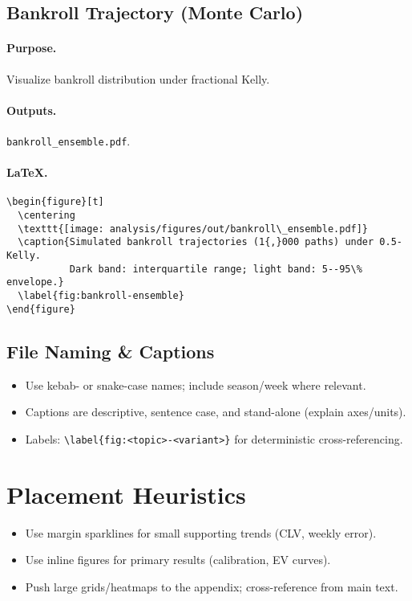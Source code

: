 \subsection{Bankroll Trajectory (Monte Carlo)}
\paragraph{Purpose.} Visualize bankroll distribution under fractional Kelly.
\paragraph{Outputs.} \texttt{bankroll\_ensemble.pdf}.
\paragraph{LaTeX.}
\begin{verbatim}
\begin{figure}[t]
  \centering
  \texttt{[image: analysis/figures/out/bankroll\_ensemble.pdf]}
  \caption{Simulated bankroll trajectories (1{,}000 paths) under 0.5-Kelly.
           Dark band: interquartile range; light band: 5--95\% envelope.}
  \label{fig:bankroll-ensemble}
\end{figure}
\end{verbatim}

\subsection{File Naming \& Captions}
\begin{itemize}
  \item Use kebab- or snake-case names; include season/week where relevant.
  \item Captions are descriptive, sentence case, and stand-alone (explain axes/units).
  \item Labels: \verb|\label{fig:<topic>-<variant>}| for deterministic cross-referencing.
\end{itemize}

\section{Placement Heuristics}
\begin{itemize}
  \item Use margin sparklines for small supporting trends (CLV, weekly error).
  \item Use inline figures for primary results (calibration, EV curves).
  \item Push large grids/heatmaps to the appendix; cross-reference from main text.
\end{itemize}
